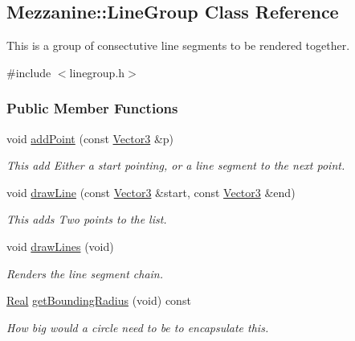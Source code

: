 \hypertarget{classMezzanine_1_1LineGroup}{
\subsection{Mezzanine::LineGroup Class Reference}
\label{classMezzanine_1_1LineGroup}
}


This is a group of consectutive line segments to be rendered together.  




{\ttfamily \#include $<$linegroup.h$>$}

\subsubsection*{Public Member Functions}
\begin{DoxyCompactItemize}
\item 
void \hyperlink{classMezzanine_1_1LineGroup_a3326fcfa0207505082af2610d73c2e46}{addPoint} (const \hyperlink{classMezzanine_1_1Vector3}{Vector3} \&p)
\begin{DoxyCompactList}\small\item\em This add Either a start pointing, or a line segment to the next point. \item\end{DoxyCompactList}\item 
void \hyperlink{classMezzanine_1_1LineGroup_acadb6f8ccbe70828b094f07a11f276ac}{drawLine} (const \hyperlink{classMezzanine_1_1Vector3}{Vector3} \&start, const \hyperlink{classMezzanine_1_1Vector3}{Vector3} \&end)
\begin{DoxyCompactList}\small\item\em This adds Two points to the list. \item\end{DoxyCompactList}\item 
void \hyperlink{classMezzanine_1_1LineGroup_a85da1685525915f1e07d685b98f79f23}{drawLines} (void)
\begin{DoxyCompactList}\small\item\em Renders the line segment chain. \item\end{DoxyCompactList}\item 
\hyperlink{namespaceMezzanine_a726731b1a7df72bf3583e4a97282c6f6}{Real} \hyperlink{classMezzanine_1_1LineGroup_acf6419a64d2d387bafe36b3dda752678}{getBoundingRadius} (void) const 
\begin{DoxyCompactList}\small\item\em How big would a circle need to be to encapsulate this. \item\end{DoxyCompactList}\item 

\end{DoxyCompactItemize}
